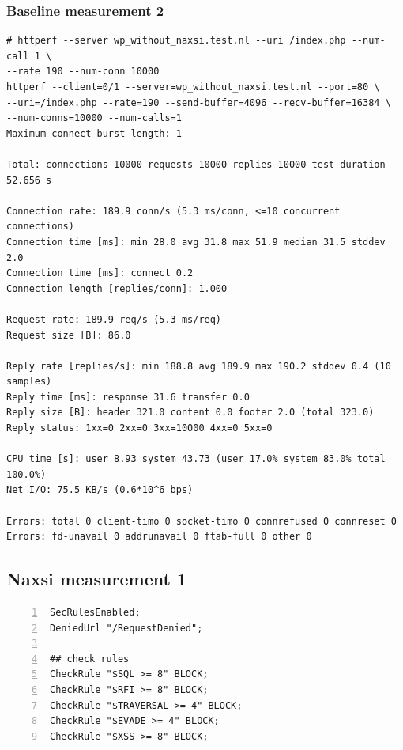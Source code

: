 \documentclass[Measurement results]{subfiles}
\begin{document}
\subsubsection{Baseline measurement 2}
\label{sec:baseline_measurement_2}
\begin{verbatim}
# httperf --server wp_without_naxsi.test.nl --uri /index.php --num-call 1 \
--rate 190 --num-conn 10000
httperf --client=0/1 --server=wp_without_naxsi.test.nl --port=80 \
--uri=/index.php --rate=190 --send-buffer=4096 --recv-buffer=16384 \ 
--num-conns=10000 --num-calls=1
Maximum connect burst length: 1

Total: connections 10000 requests 10000 replies 10000 test-duration 52.656 s

Connection rate: 189.9 conn/s (5.3 ms/conn, <=10 concurrent connections)
Connection time [ms]: min 28.0 avg 31.8 max 51.9 median 31.5 stddev 2.0
Connection time [ms]: connect 0.2
Connection length [replies/conn]: 1.000

Request rate: 189.9 req/s (5.3 ms/req)
Request size [B]: 86.0

Reply rate [replies/s]: min 188.8 avg 189.9 max 190.2 stddev 0.4 (10 samples)
Reply time [ms]: response 31.6 transfer 0.0
Reply size [B]: header 321.0 content 0.0 footer 2.0 (total 323.0)
Reply status: 1xx=0 2xx=0 3xx=10000 4xx=0 5xx=0

CPU time [s]: user 8.93 system 43.73 (user 17.0% system 83.0% total 100.0%)
Net I/O: 75.5 KB/s (0.6*10^6 bps)

Errors: total 0 client-timo 0 socket-timo 0 connrefused 0 connreset 0
Errors: fd-unavail 0 addrunavail 0 ftab-full 0 other 0
\end{verbatim}

\subsection{Naxsi measurement 1}
\label{sec:Naxsi measurement 1}
\begin{lstlisting}[frame=single,caption=/etc/nginx/nbs.rules,backgroundcolor=\color{gray},breaklines=true,numbers=left,]
SecRulesEnabled;
DeniedUrl "/RequestDenied";

## check rules
CheckRule "$SQL >= 8" BLOCK;
CheckRule "$RFI >= 8" BLOCK;
CheckRule "$TRAVERSAL >= 4" BLOCK;
CheckRule "$EVADE >= 4" BLOCK;
CheckRule "$XSS >= 8" BLOCK;
\end{lstlisting}
\end{document}
